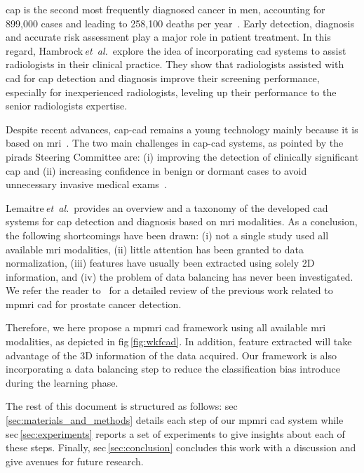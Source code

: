 \documentclass[final,3p,times,twocolumn]{elsarticle}
\begin{document}
\Ac{cap} is the second most frequently diagnosed cancer in men, accounting for
899,000 cases and leading to 258,100 deaths per
year~\citep{ferlay2010estimates}. Early detection, diagnosis and accurate risk
assessment play a major role in patient treatment. In this regard,
Hambrock\,\emph{et~al.}\,\cite{Hambrock2013} explore the idea of incorporating
\ac{cad} systems to assist radiologists in their clinical practice. They show
that radiologists assisted with \ac{cad} for \ac{cap} detection and diagnosis
improve their screening performance, especially for inexperienced radiologists,
leveling up their performance to the senior radiologists expertise.

Despite recent advances, \ac{cap}-\ac{cad} remains a young technology mainly
because it is based on \ac{mri}~\cite{Hegde2013}. The two main challenges in
\ac{cap}-\ac{cad} systems, as pointed by the \ac{pirads} Steering Committee
are: (i) improving the detection of clinically significant \ac{cap} and (ii)
increasing confidence in benign or dormant cases to avoid unnecessary invasive
medical exams~\citep{weinreb2016pi}.

Lemaitre\,\emph{et~al.}\,\cite{lemaitre2015computer} provides an
overview and a taxonomy of the developed \acs{cad} systems for \ac{cap}
detection and diagnosis based on \ac{mri} modalities. As a conclusion, the
following shortcomings have been drawn: (i) not a single study used all available
\ac{mri} modalities, (ii) little attention has been granted to data
normalization, (iii) features have usually been extracted using solely 2D
information, and (iv) the problem of data balancing has never been
investigated. We refer the reader to~\cite{lemaitre2015computer} for a detailed
review of the previous work related to \ac{mpmri} \ac{cad} for prostate cancer
detection.

Therefore, we here propose a \ac{mpmri} \ac{cad} framework using all available
\ac{mri} modalities, as depicted in \acs{fig}\,\ref{fig:wkfcad}. In addition,
feature extracted will take advantage of the 3D information of the data
acquired. Our framework is also incorporating a data balancing step to reduce
the classification bias introduce during the learning phase.

The rest of this document is structured as follows:
\acs{sec}\,\ref{sec:materials_and_methods} details each step of our \ac{mpmri}
\ac{cad} system while \acs{sec}\,\ref{sec:experiments} reports a set of
experiments to give insights about each of these steps. Finally,
\ac{sec}\,\ref{sec:conclusion} concludes this work with a discussion and give
avenues for future research.
\end{document}
